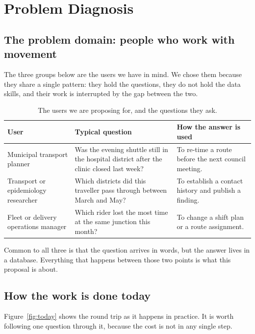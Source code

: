 \documentclass[12pt,a4paper]{report}
\begin{document}
\chapter{Problem Diagnosis}
\label{ch:diag}

\section{The problem domain: people who work with movement}

The three groups below are the users we have in mind. We chose them because they
share a single pattern: they hold the questions, they do not hold the data
skills, and their work is interrupted by the gap between the two.

\begin{table}[H]
  \centering
  \caption{The users we are proposing for, and the questions they ask.}
  \label{tab:users}
  \begin{tabular}{@{}p{3.6cm}p{5.2cm}p{6.2cm}@{}}
    \toprule[1.5pt]
    \textbf{User} & \textbf{Typical question} & \textbf{How the answer is used} \\
    \midrule
    Municipal transport planner & Was the evening shuttle still in the
      hospital district after the clinic closed last week? &
      To re-time a route before the next council meeting. \\
    \addlinespace
    Transport or epidemiology researcher & Which districts did this
      traveller pass through between March and May? &
      To establish a contact history and publish a finding. \\
    \addlinespace
    Fleet or delivery operations manager & Which rider lost the most
      time at the same junction this month? &
      To change a shift plan or a route assignment. \\
    \bottomrule[1.5pt]
  \end{tabular}
\end{table}

Common to all three is that the question arrives in words, but the answer lives
in a database. Everything that happens between those two points is what this
proposal is about.

\section{How the work is done today}

Figure~\ref{fig:today} shows the round trip as it happens in practice. It is worth
following one question through it, because the cost is not in any single step.
\end{document}
